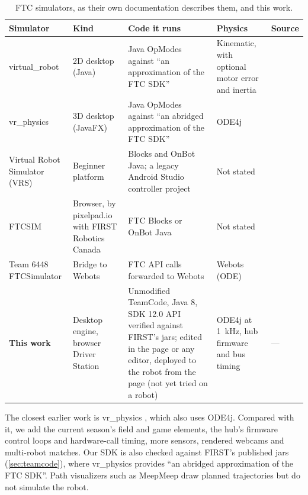 \documentclass[10pt,twocolumn,letterpaper]{article}
\begin{document}
\begin{table}[t]
\centering
\small
\caption{FTC simulators, as their own documentation describes them, and this work.}\label{tab:simulators}
\begin{tabularx}{\textwidth}{@{}>{\raggedright\arraybackslash}p{3.2cm}>{\raggedright\arraybackslash}p{3.0cm}LL>{\raggedright\arraybackslash}p{1.0cm}@{}}
\toprule
\textbf{Simulator} & \textbf{Kind} & \textbf{Code it runs} & \textbf{Physics} & \textbf{Source} \\
\midrule
virtual\_robot & 2D desktop (Java) & Java OpModes against ``an approximation of the FTC SDK'' & Kinematic, with optional motor error and inertia & \citep{beta8397virtualrobot} \\
vr\_physics & 3D desktop (JavaFX) & Java OpModes against ``an abridged approximation of the FTC SDK'' & ODE4j & \citep{beta8397vrphysics} \\
Virtual Robot Simulator (VRS) & Beginner platform & Blocks and OnBot Java; a legacy Android Studio controller project & Not stated & \citep{virtualftc} \\
FTCSIM & Browser, by pixelpad.io with FIRST Robotics Canada & FTC Blocks or OnBot Java & Not stated & \citep{ftcsim2026} \\
Team 6448 FTCSimulator & Bridge to Webots & FTC API calls forwarded to Webots & Webots (ODE) & \citep{team6448ftcsimulator} \\
\textbf{This work} & Desktop engine, browser Driver Station & Unmodified TeamCode, Java 8, SDK 12.0 API verified against FIRST's jars; edited in the page or any editor, deployed to the robot from the page (not yet tried on a robot) & ODE4j at 1~kHz, hub firmware and bus timing & — \\
\bottomrule
\end{tabularx}
\end{table}

The closest earlier work is vr\_physics \citep{beta8397vrphysics}, which also uses ODE4j. Compared with it, we add the current season's field and game elements, the hub's firmware control loops and hardware-call timing, more sensors, rendered webcams and multi-robot matches. Our SDK is also checked against FIRST's published jars (\cref{sec:teamcode}), where vr\_physics provides ``an abridged approximation of the FTC SDK''. Path visualizers such as MeepMeep \citep{bres2026meepmeep} draw planned trajectories but do not simulate the robot.
\end{document}
